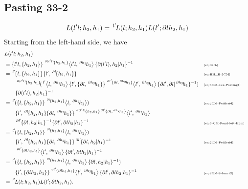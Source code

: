\documentclass[11pt, reqno]{amsart} %
\newcommand{\act}[1]{\,\sp{#1}\!}
\theoremstyle{definition}
\theoremstyle{remark}
\numberwithin{equation}{section}
\begin{document}
\subsection{Pasting 33-2}
\[
  L(l'l;h_2,h_1) = \act{l'}L(l;h_2,h_1)L(l';\partial lh_2,h_1)
\]
Starting from the left-hand side, we have
\begin{align*}
  &L(l'l;h_2,h_1) \\
  &= \{l'l,\{h_2,h_1\}\}\act{\act{\partial (l'l)}\{h_2,h_1\}}\left<l'l,\act{\partial h_2}h_1\right>\{\partial (l'l),h_2|h_1\}^{-1} & &\text{\tiny \eqref{eq:defL}} \\
  &= \act{l'}\{l,\{h_2,h_1\}\}\{l',\act{\partial l}\{h_2,h_1\}\} & &\text{\tiny \eqref{eq:HH_H-2CM}} \\
  &\qquad 
  \act{\act{\partial (l'l)}\{h_2,h_1\}}(\act{l'}\left<l,\act{\partial h_2}h_1\right>\{l',\{\partial l,\act{\partial h_2}h_1\}\}\act{\act{\partial l'}\{\partial l,\act{\partial h_2}h_1\}}\left<l',\act{\partial h_2}h_1\right>\{\partial l',\partial l|\act{\partial h_2}h_1\}^{-1}) & &\text{\tiny \eqref{eq:3CM-aux-Pasting1}} \\
  &\qquad \{\partial (l'l),h_2|h_1\}^{-1} \\
  &= \act{l'}(\{l,\{h_2,h_1\}\}\act{\act{\partial l}\{h_2,h_1\}}\left<l,\act{\partial h_2}h_1\right>) & &\text{\tiny \eqref{eq:2CM-Peifferid}} \\
  &\qquad 
  \{l',\act{\partial l}\{h_2,h_1\}\{\partial l,\act{\partial h_2}h_1\}\}\act{\act{\partial (l'l)}\{h_2,h_1\}\act{\partial l'}\{\partial l,\act{\partial h_2}h_1\}}\left<l',\act{\partial h_2}h_1\right> \\
  &\qquad \act{\partial l'}\{\partial l,h_2|h_1\}^{-1}\{\partial l',\partial lh_2|h_1\}^{-1} & &\text{\tiny \eqref{eq:3-CM-Fund-left-Hom}} \\
  &= \act{l'}(\{l,\{h_2,h_1\}\}\act{\act{\partial l}\{h_2,h_1\}}\left<l,\act{\partial h_2}h_1\right>) \\
  &\qquad 
  \{l',\act{\partial l}\{h_2,h_1\}\{\partial l,\act{\partial h_2}h_1\}\}\act{\partial l'}\{\partial l,h_2|h_1\}^{-1} & &\text{\tiny \eqref{eq:2CM-Peifferid}} \\
  &\qquad \act{\act{\partial l'}\{\partial lh_2,h_1\}}\left<l',\act{\partial h_2}h_1\right>\{\partial l',\partial lh_2|h_1\}^{-1} \\
  &= \act{l'}(\{l,\{h_2,h_1\}\}\act{\act{\partial l}\{h_2,h_1\}}\left<l,\act{\partial h_2}h_1\right>\{\partial l,h_2|h_1\}^{-1}) \\
  &\qquad 
  \{l',\{\partial lh_2,h_1\}\}\act{\act{\partial l'}\{\partial lh_2,h_1\}}\left<l',\act{\partial h_2}h_1\right>\{\partial l',\partial lh_2|h_1\}^{-1} & &\text{\tiny \eqref{eq:2CM-2-funct2}} \\
  &= \act{l'}L(l;h_2,h_1)L(l';\partial lh_2,h_1).
\end{align*}
\end{document}
